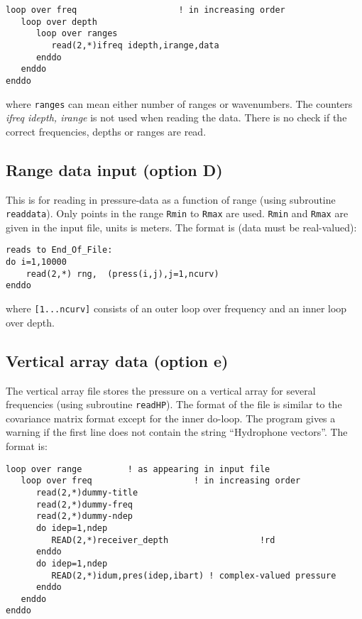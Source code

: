 \documentclass{saclantc}
\begin{document}
\small
\begin{verbatim}
loop over freq                    ! in increasing order
   loop over depth
      loop over ranges
         read(2,*)ifreq idepth,irange,data           
      enddo
   enddo
enddo
\end{verbatim}
\normalsize

where {\tt ranges} can mean either number of
 ranges or wavenumbers. The counters {\it ifreq idepth, irange} is not used when reading the data. There is no check if the correct frequencies, depths or ranges are read.

\subsection{Range data input (option D)}
\label{se:opt_D}
This is for reading in pressure-data as a function of range 
(using subroutine {\tt readdata}). 
Only points in the
range {\tt Rmin} to {\tt Rmax} are used.   {\tt Rmin} and {\tt Rmax} are 
given in the input file, units is meters.
The format is (data must be real-valued):
\small
\begin{verbatim}
reads to End_Of_File:
do i=1,10000
    read(2,*) rng,  (press(i,j),j=1,ncurv)
enddo
\end{verbatim}
\normalsize
where {\tt [1...ncurv]}  consists of an
outer loop  over frequency and an inner loop over depth.

\subsection{Vertical array data (option e)}
\label{se:opt_e}
The   vertical array file stores  
the pressure on a vertical array for several  frequencies 
(using subroutine {\tt read\-HP}).
The format of the file is similar to the 
covariance matrix format except for the inner do-loop.
 The program gives a 
warning if the first line does not contain the string ``Hydrophone vectors''.
The format is:

\small
\begin{verbatim} 
loop over range         ! as appearing in input file
   loop over freq                    ! in increasing order
      read(2,*)dummy-title
      read(2,*)dummy-freq 
      read(2,*)dummy-ndep
      do idep=1,ndep
         READ(2,*)receiver_depth                  !rd
      enddo
      do idep=1,ndep
         READ(2,*)idum,pres(idep,ibart) ! complex-valued pressure
      enddo
   enddo
enddo
\end{verbatim}
\normalsize
 
\end{document}
